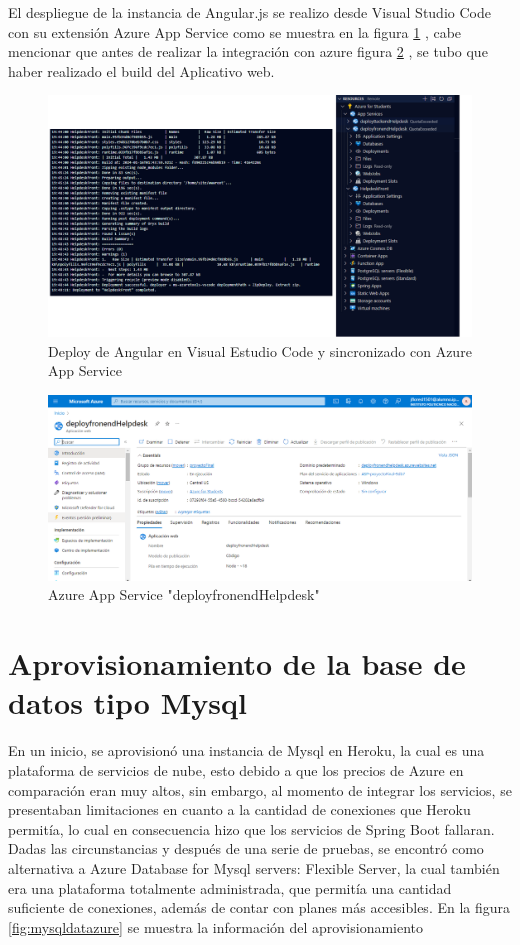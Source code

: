  El despliegue de la instancia de Angular.js se realizo desde Visual Studio Code con su extensión  Azure App Service como se muestra en la figura \ref{fig:azureangularconf} , cabe mencionar que antes de realizar la integración con azure figura \ref{fig:ssas} ,  se tubo que haber realizado  el build del Aplicativo web. 
 \begin{figure}[H]
 	\centering
 	\includegraphics[width=1.1\textwidth]{CapituloImplem/Img/AngularDeploy}
 	\caption{Deploy de Angular en Visual Estudio Code y sincronizado con Azure App Service }
 	\label{fig:azureangularconf}
 \end{figure}

 \begin{figure}[H]
	\centering
	\includegraphics[width=1.1\textwidth]{CapituloImplem/Img/InstanciaAngularNube}
	\caption{Azure App Service "deployfronendHelpdesk"}
	\label{fig:ssas}
\end{figure}



\section{Aprovisionamiento de la base de datos tipo Mysql}
En un inicio, se aprovisionó una instancia de Mysql en Heroku, la cual es una 
plataforma de servicios de nube, esto debido a que los precios de Azure en comparación 
eran muy altos, sin embargo, al momento de integrar los servicios, se presentaban 
limitaciones en cuanto a la cantidad de conexiones que Heroku permitía, lo cual en 
consecuencia hizo que los servicios de Spring Boot fallaran. 
Dadas las circunstancias y después de una serie de pruebas, se encontró como alternativa 
a Azure Database for Mysql servers: Flexible Server, la cual también era una 
plataforma totalmente administrada, que permitía una cantidad suficiente de conexiones, 
además de contar con planes más accesibles. En la figura \ref{fig:mysqldatazure} se muestra la información del 
aprovisionamiento

